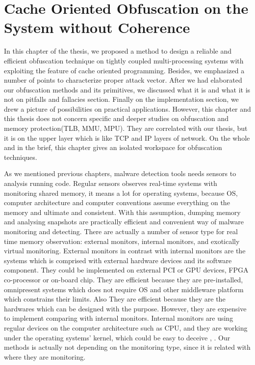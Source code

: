 \chapter{Cache Oriented Obfuscation on the System without Coherence}

In this chapter of the thesis, we proposed a method to design a reliable and efficient obfuscation technique on tightly coupled multi-processing systems with exploiting the feature of cache oriented programming. Besides, we emphasized a number of points to characterize proper attack vector. After we had elaborated our obfuscation methods and its primitives, we discussed what it is and what it is not on pitfalls and fallacies section. Finally on the implementation section, we drew a picture of possibilities on practical applications. However, this chapter and this thesis does not concern specific and deeper studies on obfuscation and memory protection(TLB, MMU, MPU). They are correlated with our thesis, but it is on the upper layer which is like TCP and IP layers of network. On the whole and in the brief, this chapter gives an isolated workspace for obfuscation techniques.

As we mentioned previous chapters, malware detection tools needs sensors to analysis running code. Regular sensors observes real-time systems with monitoring shared memory, it means a lot for operating systems, because OS, computer architecture and computer conventions assume everything on the memory and ultimate and consistent. With this assumption, dumping memory and analysing snapshots are practically efficient and convenient way of malware monitoring and detecting. There are actually a number of sensor type for real time memory observation: external monitors, internal monitors, and exotically virtual monitoring. External monitors in contrast with internal monitors are the systems which is comprised with external hardware devices and its software component. They could be implemented on external PCI or GPU devices, FPGA co-processor or on-board chip\cite{Christos2013}. They are efficient because they are pre-installed, omnipresent systems which does not require OS and other middleware platform which constrains their limits. Also They are efficient because they are the hardwares which can be designed with the purpose. However, they are expensive to implement comparing with internal monitors. Internal monitors are using regular devices on the computer architecture such as CPU, and they are working under the operating systems' kernel, which could be easy to deceive \cite{Adnan2011}, \cite{rutkowska2006rootkits}. Our methods is actually not depending on the monitoring type, since it is related with where they are monitoring.

